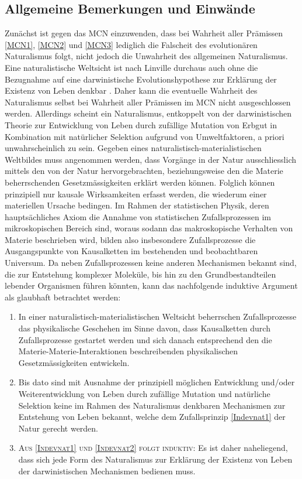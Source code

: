 \documentclass[a4paper,11pt]{article}
\numberwithin{equation}{section}
\begin{document}
\subsection{Allgemeine Bemerkungen und Einwände}
Zunächst ist gegen das MCN einzuwenden, dass bei Wahrheit aller Prämissen \ref{MCN1}, \ref{MCN2} und \ref{MCN3} lediglich die Falscheit des evolutionären Naturalismus folgt, nicht jedoch die Unwahrheit des allgemeinen Naturalismus. Eine naturalistische Weltsicht ist nach Linville durchaus auch ohne die Bezugnahme auf eine darwinistische Evolutionshypothese zur Erklärung der Existenz von Leben denkbar \cite[S. 394]{Linville2009-LINTMA-2}. Daher kann die eventuelle Wahrheit des Naturalismus selbst bei Wahrheit aller Prämissen im MCN nicht ausgeschlossen werden. Allerdings scheint ein Naturalismus, entkoppelt von der darwinistischen Theorie zur Entwicklung von Leben durch zufällige Mutation von Erbgut in Kombination mit natürlicher Selektion aufgrund von Umweltfaktoren, a priori unwahrscheinlich zu sein. Gegeben eines naturalistisch-materialistischen Weltbildes muss angenommen werden, dass Vorgänge in der Natur ausschliesslich mittels den von der Natur hervorgebrachten, beziehungsweise den die Materie beherrschenden Gesetzmässigkeiten erklärt werden können. Folglich können prinzipiell nur kausale Wirksamkeiten erfasst werden, die wiederum einer materiellen Ursache bedingen. Im Rahmen der statistischen Physik, deren hauptsächliches Axiom die Annahme von statistischen Zufallsprozessen im mikroskopischen Bereich sind, woraus sodann das makroskopische Verhalten von Materie beschrieben wird, bilden also insbesondere Zufallsprozesse die Ausgangspunkte von Kausalketten im bestehenden und beobachtbaren Universum. Da neben Zufallsprozessen keine anderen Mechanismen bekannt sind, die zur Entstehung komplexer Moleküle, bis hin zu den Grundbestandteilen lebender Organismen führen könnten, kann das nachfolgende induktive Argument als glaubhaft betrachtet werden:
\begin{enumerate}
\item In einer naturalistisch-materialistischen Weltsicht beherrschen Zufallsprozesse das physikalische Geschehen im Sinne davon, dass Kausalketten durch Zufallsprozesse gestartet werden und sich danach entsprechend den die Materie-Materie-Interaktionen beschreibenden physikalischen Gesetzmässigkeiten entwickeln.\label{Indevnat1}
\item Bis dato sind mit Ausnahme der prinzipiell möglichen Entwicklung und/oder Weiterentwicklung von Leben durch zufällige Mutation und natürliche Selektion keine im Rahmen des Naturalismus denkbaren Mechanismen zur Entstehung von Leben bekannt, welche dem Zufallsprinzip \ref{Indevnat1} der Natur gerecht werden.\label{Indevnat2}
\item  \textsc{Aus \ref{Indevnat1} und \ref{Indevnat2} folgt induktiv}: Es ist daher naheliegend, dass sich jede Form des Naturalismus zur Erklärung der Existenz von Leben der darwinistischen Mechanismen bedienen muss.\label{Indevnat3}
\end{enumerate}
\end{document}
